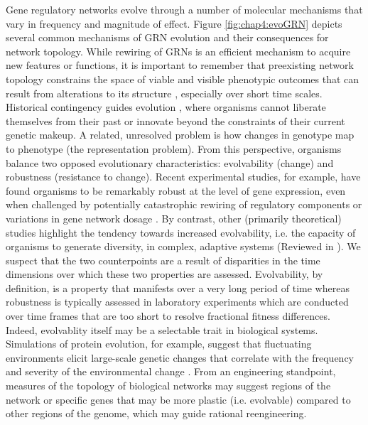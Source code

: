 Gene regulatory networks evolve through a number of molecular mechanisms that vary in frequency and magnitude of effect. Figure \ref{fig:chap4:evoGRN} depicts several common mechanisms of GRN evolution and their consequences for network topology. While rewiring of GRNs is an efficient mechanism to acquire new features or functions, it is important to remember that preexisting network topology constrains the space of viable and visible phenotypic outcomes that can result from alterations to its structure \cite{wagner_robustness_2007}, especially over short time scales. Historical contingency guides evolution \cite{gould_wonderful_1990}, where organisms cannot liberate themselves from their past or innovate beyond the constraints of their current genetic makeup. A related, unresolved problem is how changes in genotype map to phenotype (the representation problem). From this perspective, organisms balance two opposed evolutionary characteristics: evolvability (change) and robustness (resistance to change). Recent experimental studies, for example, have found organisms to be remarkably robust at the level of gene expression, even when challenged by potentially catastrophic rewiring of regulatory components \cite{isalan_evolvability_2008} or variations in gene network dosage \cite{acar_general_2010}. By contrast, other (primarily theoretical) studies highlight the tendency towards increased evolvability, i.e. the capacity of organisms to generate diversity, in complex, adaptive systems (Reviewed in \cite{wagner_perspective:_1996}).  We suspect that the two counterpoints are a result of disparities in the time dimensions over which these two properties are assessed.  Evolvability, by definition, is a property that manifests over a very long period of time whereas robustness is typically assessed in laboratory experiments which are conducted over time frames that are too short to resolve fractional fitness differences.  Indeed, evolvablity itself may be a selectable trait in biological systems. Simulations of protein evolution, for example, suggest that fluctuating environments elicit large-scale genetic changes that correlate with the frequency and severity of the environmental change \cite{earl_evolvability_2004}. From an engineering standpoint, measures of the topology of biological networks may suggest regions of the network or specific genes that may be more plastic (i.e. evolvable) compared to other regions of the genome, which may guide rational reengineering. 

